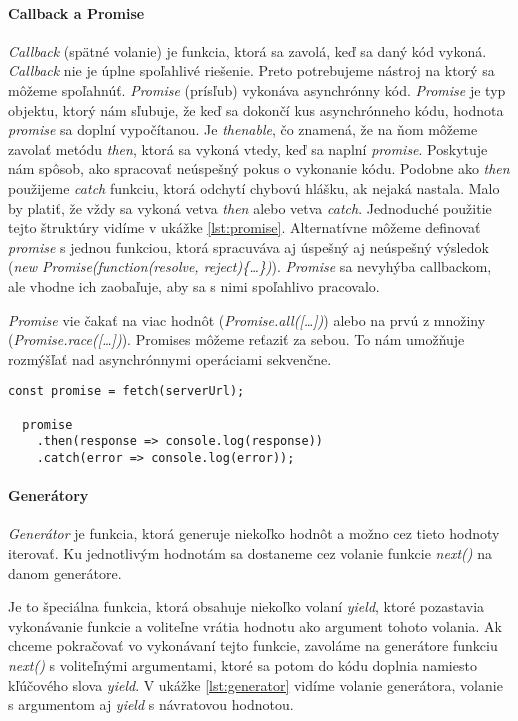 \paragraph{Callback a Promise}%
\emph{Callback} (spätné volanie) je funkcia, ktorá sa zavolá, keď sa daný kód vykoná. \emph{Callback} nie je úplne spoľahlivé riešenie. Preto potrebujeme nástroj na ktorý sa môžeme spoľahnúť. 
\emph{Promise} (prísľub) vykonáva asynchrónny kód. 
\emph{Promise} je typ objektu, ktorý nám sľubuje, že keď sa dokončí kus asynchrónneho kódu, hodnota \emph{promise} sa doplní vypočítanou. 
Je \emph{thenable}, čo znamená, že na ňom môžeme zavolať metódu \emph{then}, ktorá sa vykoná vtedy, keď sa naplní \emph{promise}. Poskytuje nám spôsob, ako spracovať neúspešný pokus o vykonanie kódu. 
Podobne ako \emph{then} použijeme \emph{catch} funkciu, ktorá odchytí chybovú hlášku, ak nejaká nastala. Malo by platiť, že vždy sa vykoná vetva \emph{then} alebo vetva \emph{catch}. Jednoduché použitie tejto štruktúry vidíme v ukážke \ref{lst:promise}.
Alternatívne môžeme definovať \emph{promise} s jednou funkciou, ktorá spracuváva aj úspešný aj neúspešný výsledok (\emph{new Promise(function(resolve, reject)\{\ldots\})}).
\emph{Promise} sa nevyhýba callbackom, ale vhodne ich zaobaľuje, aby sa s nimi spoľahlivo pracovalo.

\emph{Promise} vie čakať na viac hodnôt (\emph{Promise.all([\ldots])})
alebo na prvú z množiny (\emph{Promise.race([\ldots])}).
Promises môžeme reťaziť za sebou. To nám umožňuje rozmýšľať nad asynchrónnymi operáciami sekvenčne.

\begin{lstlisting}[caption=Promise, label={lst:promise}]
  const promise = fetch(serverUrl);

  promise
    .then(response => console.log(response))
    .catch(error => console.log(error));
\end{lstlisting}

\paragraph{Generátory}
\emph{Generátor} je funkcia, ktorá generuje niekoľko hodnôt a možno cez tieto hodnoty iterovať. Ku jednotlivým hodnotám sa dostaneme cez volanie funkcie \emph{next()} na danom generátore. 

Je to špeciálna funkcia, ktorá obsahuje niekoľko volaní \emph{yield}, ktoré pozastavia vykonávanie funkcie a voliteľne vrátia hodnotu ako argument tohoto volania. 
Ak chceme pokračovať vo vykonávaní tejto funkcie, zavoláme na generátore funkciu \emph{next()} s voliteľnými argumentami, ktoré sa potom do kódu doplnia namiesto kľúčového slova \emph{yield}.
V ukážke \ref{lst:generator} vidíme volanie generátora, volanie s argumentom aj \emph{yield} s návratovou hodnotou.


